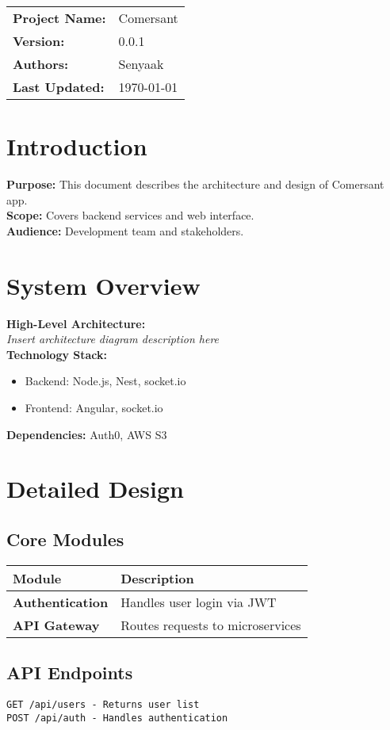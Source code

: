 \documentclass{article}
\begin{document}
\noindent
\begin{tabularx}{\textwidth}{@{} l X @{}}
\textbf{Project Name:} & Comersant \\
\textbf{Version:} & 0.0.1 \\
\textbf{Authors:} & Senyaak \\
\textbf{Last Updated:} & \today \\
\end{tabularx}

\vspace{2em}

\section*{Introduction}\label{sec:intro}
\textbf{Purpose:} This document describes the architecture and design of Comersant app. \\
\textbf{Scope:} Covers backend services and web interface. \\
\textbf{Audience:} Development team and stakeholders.

\section*{System Overview}\label{sec:overview}
\textbf{High-Level Architecture:} \\
\textit{Insert architecture diagram description here} \\
\textbf{Technology Stack:} 
\begin{itemize}
    \item Backend: Node.js, Nest, socket.io
    \item Frontend: Angular, socket.io
\end{itemize}
\textbf{Dependencies:} Auth0, AWS S3

\section*{Detailed Design}\label{sec:design}
\subsection*{Core Modules}
\begin{tabularx}{\textwidth}{@{} >{\bfseries}l X @{}}
\toprule
Module & Description \\ 
\midrule
Authentication & Handles user login via JWT \\ 
API Gateway & Routes requests to microservices \\
\bottomrule
\end{tabularx}

\subsection*{API Endpoints}
\begin{verbatim}
GET /api/users - Returns user list
POST /api/auth - Handles authentication
\end{verbatim}
\end{document}
